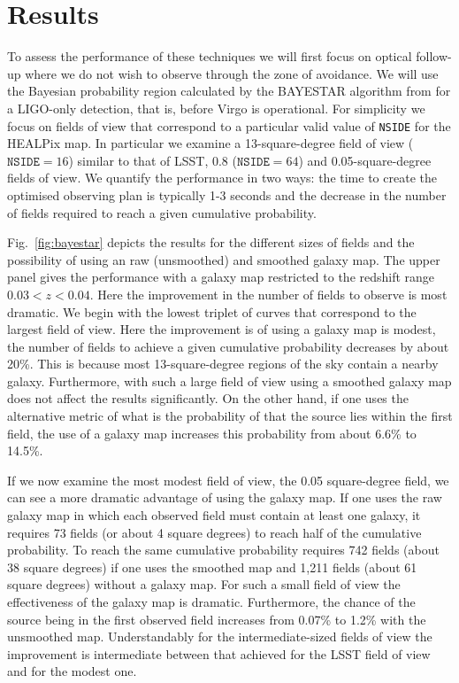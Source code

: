 \documentclass[useAMS,usenatbib]{mn2e}
\begin{document}
\section{Results}

To assess the performance of these techniques we will first focus on optical
follow-up where we do not wish to observe through the zone of
avoidance.  We will use the Bayesian probability region calculated by
the BAYESTAR algorithm \citep{2015arXiv150803634S} from
\citet{2014ApJ...795..105S} for a LIGO-only detection, that is, before
Virgo is operational.  For simplicity we focus on fields of view that
correspond to a particular valid value of \texttt{NSIDE} for the
HEALPix map.  In particular we examine a 13-square-degree field of
view ($\mathtt{NSIDE}=16$) similar to that of LSST, 0.8
($\mathtt{NSIDE}=64$) and 0.05-square-degree fields of view.  We
quantify the performance in two ways: the time to create the optimised
observing plan is typically 1-3 seconds and the decrease in the number
of fields required to reach a given cumulative probability.

Fig.~\ref{fig:bayestar} depicts the results for the different sizes of
fields and the possibility of using an raw (unsmoothed) and smoothed
galaxy map.  The upper panel gives the performance with a galaxy map
restricted to the redshift range $0.03<z<0.04$.  Here the improvement
in the number of fields to observe is most dramatic.  We begin with
the lowest triplet of curves that correspond to the largest field of
view.  Here the improvement is of using a galaxy map is modest, the
number of fields to achieve a given cumulative probability decreases
by about 20\%.  This is because most 13-square-degree regions of the
sky contain a nearby galaxy. Furthermore, with such a large field of
view using a smoothed galaxy map does not affect the results
significantly.  On the other hand, if one uses the alternative metric
of what is the probability of that the source lies within the first
field, the use of a galaxy map increases this probability from about
6.6\% to 14.5\%.

If we now examine the most modest field of view, the 0.05 square-degree
field, we can see a more dramatic advantage of using the galaxy map.
If one uses the raw galaxy map in which each observed field must
contain at least one galaxy, it requires 73 fields (or about 4 square
degrees) to reach half of the cumulative probability.  To reach the
same cumulative probability requires 742 fields (about 38 square
degrees) if one uses the smoothed map and 1,211 fields (about 61 square
degrees) without a galaxy map.  For such a small field of view the
effectiveness of the galaxy map is dramatic.  Furthermore, the chance
of the source being in the first observed field increases from 0.07\%
to 1.2\% with the unsmoothed map.  Understandably for the
intermediate-sized fields of view the improvement is intermediate
between that achieved for the LSST field of view and for the modest one.
\end{document}
